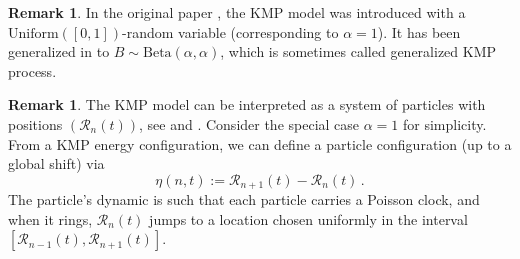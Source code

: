 \documentclass[a4paper,11pt,oneside,reqno]{amsart}
\theoremstyle{definition}
\newtheorem{remark}[theorem]{Remark}
\numberwithin{equation}{section}
\begin{document}
\begin{remark}  In the original paper \cite{kipnis1982heat}, the KMP model was introduced with a $\text{Uniform}([0,1])$-random variable (corresponding to $\alpha=1$). It has been generalized in \cite{modelsOfTransport} to $B\sim \text{Beta}(\alpha,\alpha)$, which is sometimes called generalized KMP process.
\end{remark} 
\begin{remark} 
The KMP model can be interpreted as a system of particles with positions $(\mathcal R_n(t))$, see \cite{10.1214/EJP.v3-28} and \cite{grabsch2022exact}. Consider the special case $\alpha=1$ for simplicity. From a KMP energy configuration, we can define a particle configuration (up to a global shift) via 
\begin{equation*}
	\eta(n,t):=\mathcal{R}_{n+1}(t)-\mathcal{R}_{n}(t)\,.
\end{equation*}
The particle's dynamic is such that each particle carries a Poisson clock, and when it rings, $\mathcal R_n(t)$ jumps to a location chosen uniformly in the interval $[\mathcal{R}_{n-1}(t),\mathcal{R}_{n+1}(t)]$. 
\end{remark}
\end{document}

